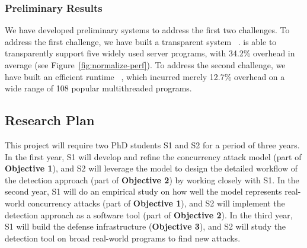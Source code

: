 



\vspace{-.15in}\subsubsection{Preliminary Results} 
\label{sec:defense-result}\vspace{-.075in}

We have developed preliminary systems to address the first two challenges. To 
address the first challenge, we have built a transparent \smr system 
\crane~\cite{crane:sosp15}. \crane is able to transparently support five widely 
used server programs, with 34.2\% overhead in average (see 
Figure~\ref{fig:normalize-perf}). To address the second challenge, we have built 
an efficient \dmt runtime \parrot~\cite{parrot:sosp13}, which incurred merely 
12.7\% overhead on a wide range of 108 popular multithreaded programs.

\vspace{-.15in}\subsection{Research Plan} \label{sec:plan}\vspace{-.075in}

This project will require two PhD students S1 and S2 for a period of 
three years. In the first year, S1 will develop and refine the concurrency 
attack model (part of \textbf{Objective 1}), and S2 will leverage the model to 
design the detailed workflow of the detection approach (part of \textbf{Objective 2}) by working 
closely with S1. In the second year, S1 will do an empirical study on how well 
the model represents real-world concurrency attacks (part of \textbf{Objective 1}), and S2 will implement 
the detection approach as a software tool (part of \textbf{Objective 2}). In the third 
year, S1 will build the defense infrastructure (\textbf{Objective 3}), and S2 
will study the detection tool on broad real-world programs to find new attacks.


